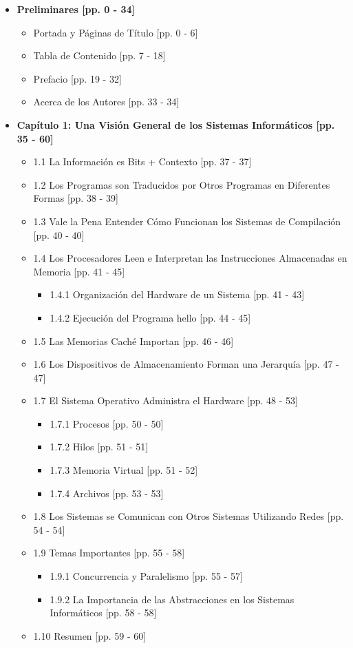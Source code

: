 \documentclass[11pt,a4paper]{article}
\begin{document}
\begin{itemize}
    \item \textbf{Preliminares [pp. 0 - 34]}
    \begin{itemize}
        \item Portada y Páginas de Título [pp. 0 - 6]
        \item Tabla de Contenido [pp. 7 - 18]
        \item Prefacio [pp. 19 - 32]
        \item Acerca de los Autores [pp. 33 - 34]
    \end{itemize}
    
    \item \textbf{Capítulo 1: Una Visión General de los Sistemas Informáticos [pp. 35 - 60]}
    \begin{itemize}
        \item 1.1 La Información es Bits + Contexto [pp. 37 - 37]
        \item 1.2 Los Programas son Traducidos por Otros Programas en Diferentes Formas [pp. 38 - 39]
        \item 1.3 Vale la Pena Entender Cómo Funcionan los Sistemas de Compilación [pp. 40 - 40]
        \item 1.4 Los Procesadores Leen e Interpretan las Instrucciones Almacenadas en Memoria [pp. 41 - 45]
        \begin{itemize}
            \item 1.4.1 Organización del Hardware de un Sistema [pp. 41 - 43]
            \item 1.4.2 Ejecución del Programa hello [pp. 44 - 45]
        \end{itemize}
        \item 1.5 Las Memorias Caché Importan [pp. 46 - 46]
        \item 1.6 Los Dispositivos de Almacenamiento Forman una Jerarquía [pp. 47 - 47]
        \item 1.7 El Sistema Operativo Administra el Hardware [pp. 48 - 53]
        \begin{itemize}
            \item 1.7.1 Procesos [pp. 50 - 50]
            \item 1.7.2 Hilos [pp. 51 - 51]
            \item 1.7.3 Memoria Virtual [pp. 51 - 52]
            \item 1.7.4 Archivos [pp. 53 - 53]
        \end{itemize}
        \item 1.8 Los Sistemas se Comunican con Otros Sistemas Utilizando Redes [pp. 54 - 54]
        \item 1.9 Temas Importantes [pp. 55 - 58]
        \begin{itemize}
            \item 1.9.1 Concurrencia y Paralelismo [pp. 55 - 57]
            \item 1.9.2 La Importancia de las Abstracciones en los Sistemas Informáticos [pp. 58 - 58]
        \end{itemize}
        \item 1.10 Resumen [pp. 59 - 60]
    \end{itemize}


\end{itemize}
\end{document}
